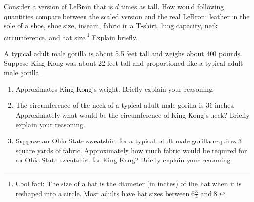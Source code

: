 \documentclass[nooutcomes]{ximera}
\begin{document}
\begin{problem}
Consider a version of LeBron that is $d$ times as tall.  How would following quantities compare between the scaled version and the real LeBron:   leather in the sole of a shoe, shoe size, inseam, fabric in a T-shirt, lung capacity, neck circumference, and hat size.\footnote{Cool fact:  The size of a hat is the diameter (in inches) of the hat when it is reshaped into a circle.  Most adults have hat sizes between $6\frac{3}{4}$ and $8$.}  Explain briefly.  
\end{problem}


\begin{problem}
A typical adult male gorilla is about 5.5 feet tall and weighs about 400 pounds. Suppose King Kong was about 22 feet tall and proportioned like a typical adult male gorilla.
\begin{enumerate}
\item Approximates King Kong's weight. Briefly explain your reasoning.
\item The circumference of the neck of a typical adult male gorilla is 36 inches. Approximately what would be the circumference of King Kong's neck? Briefly explain your reasoning.
\item Suppose an Ohio State sweatshirt for a typical adult male gorilla requires 3 square yards of fabric.  Approximately how much fabric would be required for an Ohio State sweatshirt for King Kong?  Briefly explain your reasoning.
\end{enumerate}
\end{problem}
\end{document}
